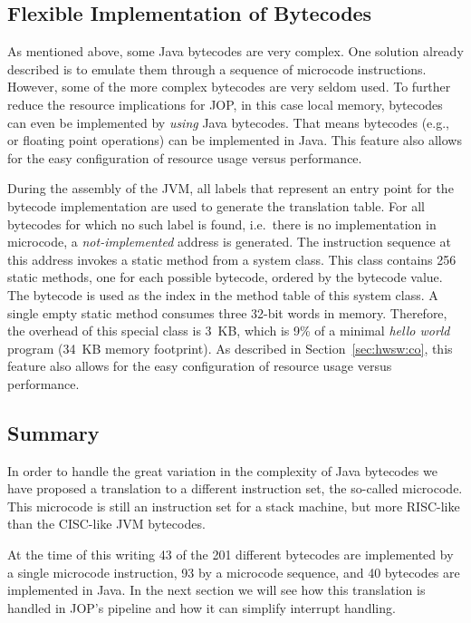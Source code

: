 \subsection{Flexible Implementation of Bytecodes}
\label{subsec:flex:bc}

As mentioned above, some Java bytecodes are very complex. One
solution already described is to emulate them through a sequence of
microcode instructions. However, some of the more complex bytecodes
are very seldom used. To further reduce the resource implications
for JOP, in this case local memory, bytecodes can even be
implemented by \emph{using} Java bytecodes. That means bytecodes
(e.g.,  or floating point operations) can be implemented
in Java. This feature also allows for the easy configuration of
resource usage versus performance.

During the assembly of the JVM, all labels that represent an entry
point for the bytecode implementation are used to generate the
translation table. For all bytecodes for which no such label is
found, i.e.\ there is no implementation in microcode, a
\emph{not-implemented} address is generated. The instruction
sequence at this address invokes a static method from a system
class. This class contains 256 static methods, one for each possible
bytecode, ordered by the bytecode value. The bytecode is used as the
index in the method table of this system class. A single empty
static method consumes three 32-bit words in memory. Therefore, the
overhead of this special class is 3~KB, which is 9\% of a minimal
\emph{hello world} program (34~KB memory footprint). As described in
Section~\ref{sec:hwsw:co}, this feature also allows for the easy
configuration of resource usage versus performance.

\subsection{Summary}

In order to handle the great variation in the complexity of Java
bytecodes we have proposed a translation to a different instruction
set, the so-called microcode. This microcode is still an instruction
set for a stack machine, but more RISC-like than the CISC-like JVM
bytecodes.

At the time of this writing 43 of the 201 different bytecodes are
implemented by a single microcode instruction, 93 by a microcode
sequence, and 40 bytecodes are implemented in Java. In the next
section we will see how this translation is handled in JOP's
pipeline and how it can simplify interrupt handling.


